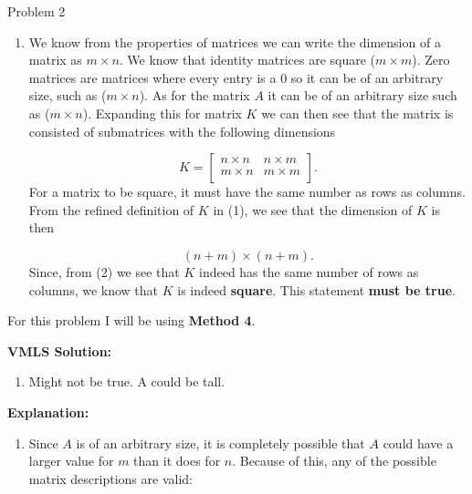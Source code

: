 \begin{problem}{Problem 2}
\begin{highlight}
        \begin{enumerate}[label = (\alph*)]
            \item We know from the properties of matrices we can write the dimension of a matrix as $m \times n$. We know that identity matrices are square ($m \times m$). Zero matrices are matrices 
            where every entry is a 0 so it can be of an arbitrary size, such as ($m \times n$). As for the matrix $A$ it can be of an arbitrary size such as ($m \times n$). Expanding this for matrix $K$ 
            we can then see that the matrix is consisted of submatrices with the following dimensions

            \begin{equation}
                K = 
                \begin{bmatrix}
                    n \times n & n \times m \\
                    m \times n & m \times m \\
                \end{bmatrix}.
            \end{equation}
            For a matrix to be square, it must have the same number as rows as columns. From the refined definition of $K$ in (1), we see that the dimension of $K$ is then

            \begin{equation}
                (n + m) \times (n + m).
            \end{equation}
            Since, from (2) we see that $K$ indeed has the same number of rows as columns, we know that $K$ is indeed \textbf{square}. This statement \textbf{must be true}.
        \end{enumerate}
    \end{highlight}

    \begin{highlight}
        For this problem I will be using \textbf{Method 4}. \vspace*{1em}

        \noindent \textbf{VMLS Solution:}

        \begin{enumerate}[label = (\alph*), start = 2]
            \item Might not be true. A could be tall.
        \end{enumerate}

        \noindent \textbf{Explanation:}

        \begin{enumerate}[label = (\alph*), start = 2]
            \item Since $A$ is of an arbitrary size, it is completely possible that $A$ could have a larger value for $m$ than it does for $n$. Because of this, any of the possible
            matrix descriptions are valid:


\end{enumerate}
\end{highlight}
\end{problem}

